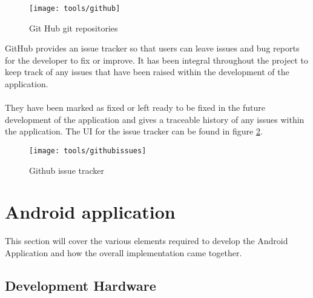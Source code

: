 \begin{figure}[H]
    \centering
    \texttt{[image: tools/github]}
    \caption{Git Hub git repositories}
    \label{fig:git_hub_repos_image}
\end{figure} 

\noindent
GitHub provides an issue tracker so that users can leave issues and bug reports for the developer to fix or improve. It has been integral throughout the project to keep track of any issues that have been raised within the development of the application.\\
\\
They have been marked as fixed or left ready to be fixed in the future development of the application and gives a traceable history of any issues within the application. The UI for the issue tracker can be found in figure \ref{fig:gh_issue_tracker_image}.

\begin{figure}[H]
    \centering
    \texttt{[image: tools/githubissues]}
    \caption{Github issue tracker}
    \label{fig:gh_issue_tracker_image}
\end{figure} 

\section{Android application}

This section will cover the various elements required to develop the Android Application and how the overall implementation came together.

\subsection{Development Hardware}
\label{sec:dev_hardware}

